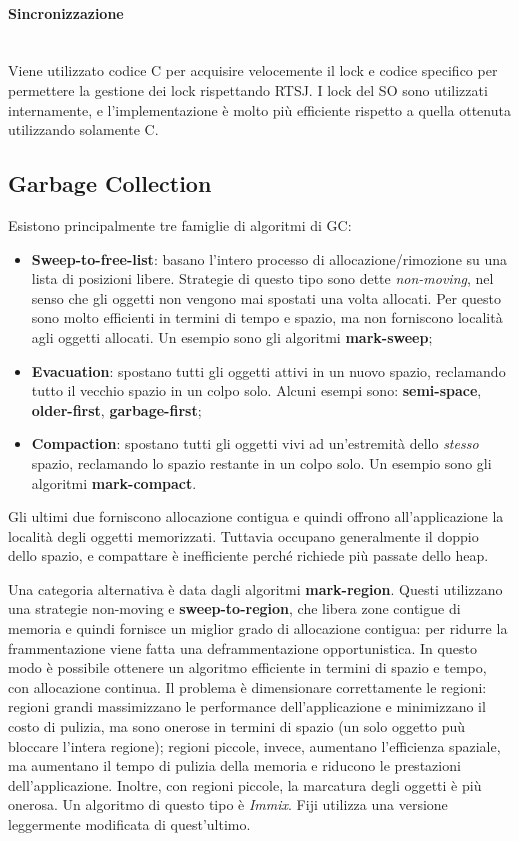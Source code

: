 \paragraph{Sincronizzazione} \mbox{} \\
Viene utilizzato codice C per acquisire velocemente il lock e codice specifico per permettere la gestione dei lock rispettando RTSJ. I lock del SO sono utilizzati internamente, e l'implementazione è molto più efficiente rispetto a quella ottenuta utilizzando solamente C.

\subsection{Garbage Collection}
Esistono principalmente tre famiglie di algoritmi di GC:
\begin{itemize}
	\item \textbf{Sweep-to-free-list}: basano l'intero processo di allocazione/rimozione su una lista di posizioni libere. Strategie di questo tipo sono dette \textit{non-moving}, nel senso che gli oggetti non vengono mai spostati una volta allocati. Per questo sono molto efficienti in termini di tempo e spazio, ma non forniscono località agli oggetti allocati. Un esempio sono gli algoritmi \textbf{mark-sweep};
	\item \textbf{Evacuation}: spostano tutti gli oggetti attivi in un nuovo spazio, reclamando tutto il vecchio spazio in un colpo solo. Alcuni esempi sono: \textbf{semi-space}, \textbf{older-first}, \textbf{garbage-first};
	\item \textbf{Compaction}: spostano tutti gli oggetti vivi ad un'estremità dello \textit{stesso} spazio, reclamando lo spazio restante in un colpo solo. Un esempio sono gli algoritmi \textbf{mark-compact}.
\end{itemize}
Gli ultimi due forniscono allocazione contigua e quindi offrono all'applicazione la località degli oggetti memorizzati. Tuttavia occupano generalmente il doppio dello spazio, e compattare è inefficiente perché richiede più passate dello heap.

Una categoria alternativa è data dagli algoritmi \textbf{mark-region}. Questi utilizzano una strategie non-moving e \textbf{sweep-to-region}, che libera zone contigue di memoria e quindi fornisce un miglior grado di allocazione contigua: per ridurre la frammentazione viene fatta una deframmentazione opportunistica. In questo modo è possibile ottenere un algoritmo efficiente in termini di spazio e tempo, con allocazione continua. Il problema è dimensionare correttamente le regioni: regioni grandi massimizzano le performance dell'applicazione e minimizzano il costo di pulizia, ma sono onerose in termini di spazio (un solo oggetto puù bloccare l'intera regione); regioni piccole, invece, aumentano l'efficienza spaziale, ma aumentano il tempo di pulizia della memoria e riducono le prestazioni dell'applicazione. Inoltre, con regioni piccole, la marcatura degli oggetti è più onerosa. Un algoritmo di questo tipo è \textit{Immix}. Fiji utilizza una versione leggermente modificata di quest'ultimo.

